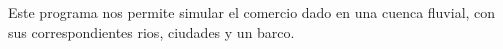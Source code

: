 Este programa nos permite simular el comercio dado en una cuenca fluvial, con sus correspondientes rios, ciudades y un barco. 